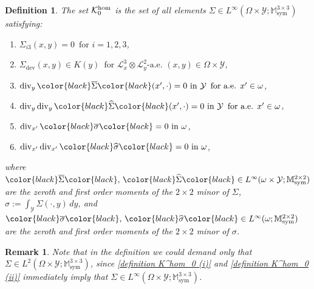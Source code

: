 \documentclass[reqno,10pt]{amsart}
\numberwithin{equation}{section}
\newtheorem{definition}[theorem]{Definition}
\newtheorem{remark}[theorem]{Remark}
\theoremstyle{remark}
\newcommand{\BLACK}{\color{black}}
\newcommand{\PINK}{\color{black}}
\newcommand{\calK}{\mathcal{K}}
\newcommand{\calL}{\mathcal{L}}
\newcommand{\M}{\mathbb{M}}
\newcommand{\calY}{\mathcal{Y}}
\DeclareMathOperator{\dev}{dev}
\DeclareMathOperator{\sym}{sym}
\renewcommand{\div}{\operatorname{div}}
\newcommand{\Dir}{D}
\newcommand{\zerothI}[1]{\overline{#1}}
\newcommand{\firstI}[1]{\widehat{#1}}
\begin{document}
\begin{definition} \label{definition K^hom_0}
The set $\calK^{\rm hom}_{0}$ is the set of all elements $\Sigma \in L^{\infty}(\Omega \times \calY;\M^{3 \times 3}_{\sym})$ satisfying:
\begin{enumerate}[label=(\roman*)]
	\item \label{definition K^hom_0 (i)} $\Sigma_{i3}(x,y) = 0 \,\text{ for } i=1,2,3$,
	\item \label{definition K^hom_0 (ii)} $\Sigma_{\dev}(x,y) \in K(y) \,\text{ for } \calL^{3}_{x} \otimes \calL^{2}_{y}\text{-a.e. } (x,y) \in \Omega \times \calY$,
	\item \label{definition K^hom_0 (iii)} $\div_{y}{\PINK\zerothI{\Sigma}\BLACK}(x',\cdot) = 0 \text{ in } \calY \,\text{ for a.e. } x' \in \omega$,
	\item \label{definition K^hom_0 (iv)} $\div_{y}\div_{y}{\PINK\firstI{\Sigma}\BLACK}(x',\cdot) = 0 \text{ in } \calY \,\text{ for a.e. } x' \in \omega$,
	\item \label{definition K^hom_0 (v)} $\div_{x'}{\PINK\zerothI{\sigma}\BLACK} = 0 \text{ in } \omega$,
	\item \label{definition K^hom_0 (vi)} $\div_{x'}\div_{x'}{\PINK\firstI{\sigma}\BLACK} = 0 \text{ in } \omega$,
\end{enumerate}
where ${\PINK\zerothI{\Sigma}\BLACK},\, {\PINK\firstI{\Sigma}\BLACK} \in L^{\infty}(\omega \times \calY;\M^{2 \times 2}_{\sym})$ are the zeroth and first order moments of the $2 \times 2$ minor of $\Sigma$, \
$\sigma := \int_{\calY} \Sigma(\cdot,y) \,dy$, and ${\PINK\zerothI{\sigma}\BLACK},\, {\PINK\firstI{\sigma}\BLACK} \in L^{\infty}(\omega;\M^{2 \times 2}_{\sym})$ are the zeroth and first order moments of the $2 \times 2$ minor of $\sigma$.
\end{definition}

\begin{remark} \label{rem Linfty} 
Note that in the definition we could demand only that $\Sigma \in L^2(\Omega \times \calY;\M^{3 \times 3}_{\sym})$, since \ref{definition K^hom_0 (i)} and \ref{definition K^hom_0 (ii)} immediately imply that $\Sigma \in L^\infty(\Omega \times \calY;\M^{3 \times 3}_{\sym})$.
\end{remark}
\end{document}
